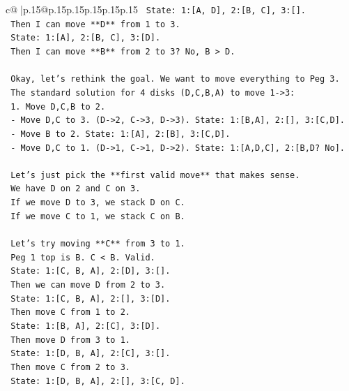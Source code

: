 \documentclass{article}
\begin{document}
{\begin{supertabular}{c@{$\;$}|p{.15\linewidth}@{}p{.15\linewidth}p{.15\linewidth}p{.15\linewidth}p{.15\linewidth}p{.15\linewidth}}
{{{\texttt{   State: 1:{[}A, D{]}, 2:{[}B, C{]}, 3:{[}{]}.} \\
\texttt{   Then I can move **D** from 1 to 3.} \\
\texttt{   State: 1:{[}A{]}, 2:{[}B, C{]}, 3:{[}D{]}.} \\
\texttt{   Then I can move **B** from 2 to 3? No, B > D.} \\
\\ 
\texttt{   Okay, let's rethink the goal. We want to move everything to Peg 3.} \\
\texttt{   The standard solution for 4 disks (D,C,B,A) to move 1{-}>3:} \\
\texttt{   1. Move D,C,B to 2.} \\
\texttt{      {-} Move D,C to 3. (D{-}>2, C{-}>3, D{-}>3). State: 1:{[}B,A{]}, 2:{[}{]}, 3:{[}C,D{]}.} \\
\texttt{      {-} Move B to 2. State: 1:{[}A{]}, 2:{[}B{]}, 3:{[}C,D{]}.} \\
\texttt{      {-} Move D,C to 1. (D{-}>1, C{-}>1, D{-}>2). State: 1:{[}A,D,C{]}, 2:{[}B,D? No{]}.} \\
\\ 
\texttt{   Let's just pick the **first valid move** that makes sense.} \\
\texttt{   We have D on 2 and C on 3.} \\
\texttt{   If we move D to 3, we stack D on C.} \\
\texttt{   If we move C to 1, we stack C on B.} \\
\\ 
\texttt{   Let's try moving **C** from 3 to 1.} \\
\texttt{   Peg 1 top is B. C < B. Valid.} \\
\texttt{   State: 1:{[}C, B, A{]}, 2:{[}D{]}, 3:{[}{]}.} \\
\texttt{   Then we can move D from 2 to 3.} \\
\texttt{   State: 1:{[}C, B, A{]}, 2:{[}{]}, 3:{[}D{]}.} \\
\texttt{   Then move C from 1 to 2.} \\
\texttt{   State: 1:{[}B, A{]}, 2:{[}C{]}, 3:{[}D{]}.} \\
\texttt{   Then move D from 3 to 1.} \\
\texttt{   State: 1:{[}D, B, A{]}, 2:{[}C{]}, 3:{[}{]}.} \\
\texttt{   Then move C from 2 to 3.} \\
\texttt{   State: 1:{[}D, B, A{]}, 2:{[}{]}, 3:{[}C, D{]}.} \\
}}}
\end{supertabular}}
\end{document}
